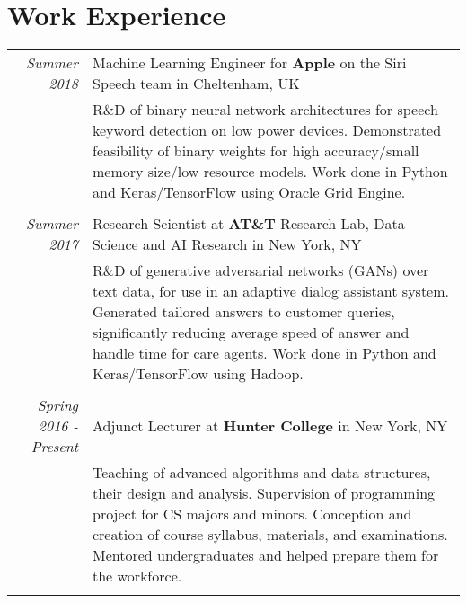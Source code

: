 \documentclass[a4paper,10pt]{article}
\begin{document}
\section{Work Experience}
    \vspace{0.2cm}
    \begin{tabular}{r|p{14cm}}
        \emph{Summer 2018} & Machine Learning Engineer for {\bfseries Apple} on the Siri Speech team in Cheltenham, UK\\
        & \small{R\&D of binary neural network architectures for speech keyword detection on low power devices. Demonstrated feasibility of binary weights for high accuracy/small memory size/low resource models. Work done in Python and Keras/TensorFlow using Oracle Grid Engine.}\\
        \multicolumn{2}{c}{} \vspace{-1.5mm} \\

        \emph{Summer 2017}& Research Scientist at {\bfseries AT\&T} Research Lab, Data Science and AI Research in New York, NY\\
        & \small{R\&D of generative adversarial networks (GANs) over text data, for use in an adaptive dialog assistant system. Generated tailored answers to customer queries, significantly reducing average speed of answer and handle time for care agents. Work done in Python and Keras/TensorFlow using Hadoop.}\\
        \multicolumn{2}{c}{} \vspace{-1.5mm} \\
        
        \emph{Spring 2016 - Present} &  Adjunct Lecturer at {\bfseries Hunter College} in New York, NY\\
        & \small{Teaching of advanced algorithms and data structures, their design and analysis. Supervision of programming project for CS majors and minors. Conception and creation of course syllabus, materials, and examinations. Mentored undergraduates and helped prepare them for the workforce. }\\
        \multicolumn{2}{c}{} \vspace{-1.5mm} \\
        

\end{tabular}
\end{document}
